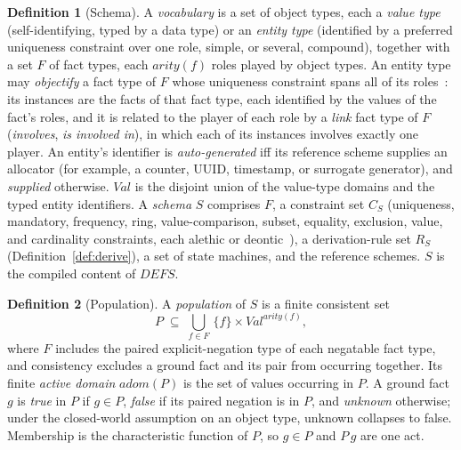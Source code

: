 \documentclass[10pt,twocolumn]{article}
\theoremstyle{plain}
\theoremstyle{definition}
\newtheorem{definition}{Definition}
\begin{document}
\begin{definition}[Schema]\label{def:schema}
A \emph{vocabulary} is a set of object types, each a \emph{value type} (self-identifying, typed by a data type) or an \emph{entity type} (identified by a preferred uniqueness constraint over one role, simple, or several, compound), together with a set $F$ of fact types, each $\mathit{arity}(f)$ roles played by object types. An entity type may \emph{objectify} a fact type of $F$ whose uniqueness constraint spans all of its roles~\cite{halpin20}: its instances are the facts of that fact type, each identified by the values of the fact's roles, and it is related to the player of each role by a \emph{link} fact type of $F$ (\emph{involves}, \emph{is involved in}), in which each of its instances involves exactly one player. An entity's identifier is \emph{auto-generated} iff its reference scheme supplies an allocator (for example, a counter, UUID, timestamp, or surrogate generator), and \emph{supplied} otherwise. $\mathit{Val}$ is the disjoint union of the value-type domains and the typed entity identifiers. A \emph{schema} $S$ comprises $F$, a constraint set $C_S$ (uniqueness, mandatory, frequency, ring, value-comparison, subset, equality, exclusion, value, and cardinality constraints, each alethic or deontic~\cite{norma}), a derivation-rule set $R_S$ (Definition~\ref{def:derive}), a set of state machines, and the reference schemes. $S$ is the compiled content of $\mathit{DEFS}$.
\end{definition}

\begin{definition}[Population]\label{def:pop}
A \emph{population} of $S$ is a finite consistent set
\[
P \;\subseteq\; \textstyle\bigcup_{f\in F}\,\{f\}\times\mathit{Val}^{\mathit{arity}(f)},
\]
where $F$ includes the paired explicit-negation type of each negatable fact type, and consistency excludes a ground fact and its pair from occurring together. Its finite \emph{active domain} $\mathit{adom}(P)$ is the set of values occurring in $P$. A ground fact $g$ is \emph{true} in $P$ if $g\in P$, \emph{false} if its paired negation is in $P$, and \emph{unknown} otherwise; under the closed-world assumption on an object type, unknown collapses to false. Membership is the characteristic function of $P$, so $g\in P$ and $P\,g$ are one act.
\end{definition}
\end{document}
